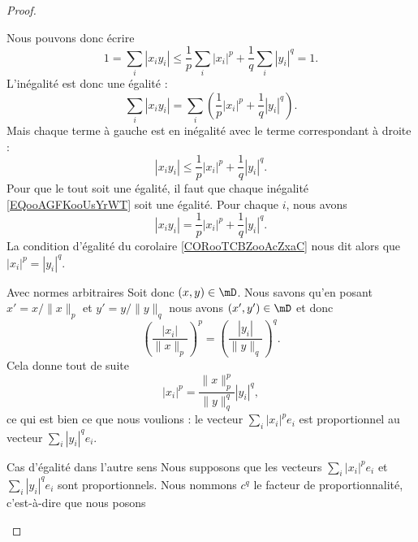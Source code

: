 \begin{proof}
\begin{subproof}
\begin{subproof}
                Nous pouvons donc écrire
                \begin{equation}
                    1=\sum_i| x_iy_i |\leq \frac{1}{ p }\sum_i| x_i |^p+\frac{1}{ q }\sum_i| y_i |^q=1.
                \end{equation}
                L'inégalité est donc une égalité :
                \begin{equation}
                    \sum_i| x_iy_i |=\sum_i\left( \frac{1}{ p }| x_i |^p+\frac{1}{ q }| y_i |^q \right).
                \end{equation}
                Mais chaque terme à gauche est en inégalité avec le terme correspondant à droite :
                \begin{equation}        \label{EQooAGFKooUsYrWT}
                    | x_iy_i |\leq \frac{1}{ p }| x_i |^p+\frac{1}{ q }| y_i |^q.
                \end{equation}
                Pour que le tout soit une égalité, il faut que chaque inégalité \eqref{EQooAGFKooUsYrWT} soit une égalité. Pour chaque \( i\), nous avons
                \begin{equation}
                    | x_iy_i |=\frac{1}{ p }| x_i |^p+\frac{1}{ q }| y_i |^q.
                \end{equation}
                La condition d'égalité du corolaire \ref{CORooTCBZooAcZxaC} nous dit alors que \( | x_i |^p=| y_i |^q\).
        \item[Avec normes arbitraires]
                Soit donc \( (x,y)\in \mD\). Nous savons qu'en posant \( x'=x/\| x \|_p\) et \( y'=y/\| y \|_q\) nous avons \( (x',y')\in \mD\) et donc
                \begin{equation}
                    \left( \frac{ | x_i | }{ \| x \|_p } \right)^p=\left( \frac{ | y_i | }{ \| y \|_q } \right)^q.
                \end{equation}
                Cela donne tout de suite
                \begin{equation}
                    | x_i |^p=\frac{ \| x \|_p^p }{ \| y \|_q^q }| y_i |^q,
                \end{equation}
                ce qui est bien ce que nous voulions : le vecteur \( \sum_i| x_i |^pe_i\) est proportionnel au vecteur \( \sum_i| y_i |^qe_i\).
            \end{subproof}
        \item[Cas d'égalité dans l'autre sens\cite{MonCerveau}]
            Nous supposons que les vecteurs \( \sum_i| x_i |^pe_i\) et \( \sum_i| y_i |^qe_i\) sont proportionnels. Nous nommons \( c^q\) le facteur de proportionnalité, c'est-à-dire que nous posons

\end{subproof}
\end{proof}
